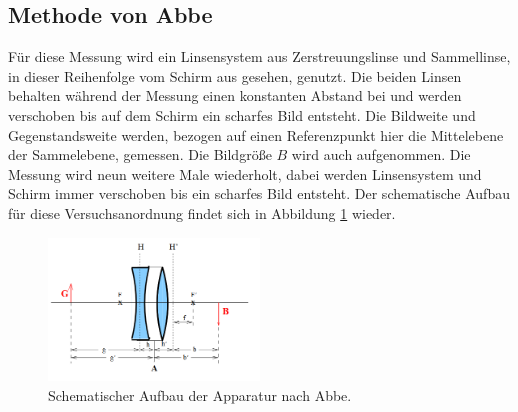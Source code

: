 \subsection{Methode von Abbe}
Für diese Messung wird ein Linsensystem aus Zerstreuungslinse und Sammellinse, in dieser Reihenfolge
vom Schirm aus gesehen, genutzt. Die beiden Linsen behalten während der Messung einen konstanten Abstand
bei und werden verschoben bis auf dem Schirm ein scharfes Bild entsteht. Die Bildweite und Gegenstandsweite
werden, bezogen auf einen Referenzpunkt hier die Mittelebene der Sammelebene, gemessen. Die
Bildgröße $B$ wird auch aufgenommen. Die Messung wird neun weitere Male wiederholt, dabei werden Linsensystem und
Schirm immer verschoben bis ein scharfes Bild entsteht.
Der schematische Aufbau für diese Versuchsanordnung findet sich in Abbildung \ref{fig:Abbe} wieder.
\begin{figure}
 \centering
 \includegraphics[width=0.5\textwidth]{abbe.png}
 \caption{Schematischer Aufbau der Apparatur nach Abbe\cite{sample}.}
 \label{fig:Abbe}
 \end{figure}
